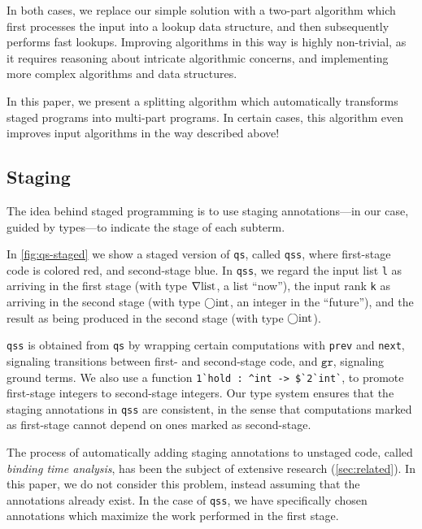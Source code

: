 \begin{abstrsyn}
In both cases, we replace our simple solution with a two-part algorithm which
first processes the input into a lookup data structure, and then subsequently
performs fast lookups. Improving algorithms in this way is highly non-trivial,
as it requires reasoning about intricate algorithmic concerns, and implementing
more complex algorithms and data structures.  

In this paper, we present a splitting algorithm which automatically transforms
staged programs into multi-part programs. In certain cases, this algorithm even
improves input algorithms in the way described above!

\subsection{Staging}


The idea behind staged programming is to use staging annotations---in our case,
guided by types---to indicate the stage of each subterm. 

In \ref{fig:qs-staged} we show a staged version of \texttt{qs}, called
\texttt{qss}, where first-stage code is colored red, and second-stage blue. In
\texttt{qss}, we regard the input list \texttt{l} as arriving in the first stage
(with type $\nabla\mathrm{list}$, a list ``now''), the input rank \texttt{k} as
arriving in the second stage (with type $\bigcirc{\rm int}$, an integer in the
``future''), and the result as being produced in the second stage (with type
$\bigcirc{\rm int}$).

\texttt{qss} is obtained from \texttt{qs} by wrapping certain computations with
\texttt{prev} and \texttt{next}, signaling transitions between first- and
second-stage code, and $\texttt{gr}$, signaling ground terms.  
%
We also use a function
\lstinline{1`hold : ^int -> $`2`int`},
to promote first-stage integers to second-stage integers.
%
Our type system ensures that the staging annotations in \texttt{qss} are
consistent, in the sense that computations marked as first-stage cannot depend
on ones marked as second-stage.

The process of automatically adding staging annotations to unstaged code,
called \emph{binding time analysis}, has been
the subject of extensive research (\ref{sec:related}). In this paper, we do not
consider this problem, instead assuming that the annotations already exist.
In the case of \texttt{qss}, we have specifically chosen annotations which
maximize the work performed in the first stage.


\end{abstrsyn}
